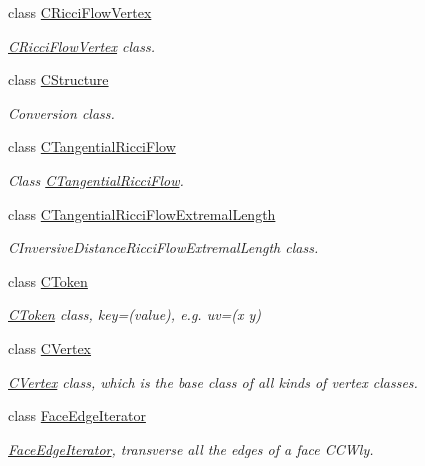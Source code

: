 \begin{DoxyCompactItemize}
class \hyperlink{class_mesh_lib_1_1_c_ricci_flow_vertex}{C\+Ricci\+Flow\+Vertex}
\begin{DoxyCompactList}\small\item\em \hyperlink{class_mesh_lib_1_1_c_ricci_flow_vertex}{C\+Ricci\+Flow\+Vertex} class. \end{DoxyCompactList}\item 
class \hyperlink{class_mesh_lib_1_1_c_structure}{C\+Structure}
\begin{DoxyCompactList}\small\item\em Conversion class. \end{DoxyCompactList}\item 
class \hyperlink{class_mesh_lib_1_1_c_tangential_ricci_flow}{C\+Tangential\+Ricci\+Flow}
\begin{DoxyCompactList}\small\item\em Class \hyperlink{class_mesh_lib_1_1_c_tangential_ricci_flow}{C\+Tangential\+Ricci\+Flow}. \end{DoxyCompactList}\item 
class \hyperlink{class_mesh_lib_1_1_c_tangential_ricci_flow_extremal_length}{C\+Tangential\+Ricci\+Flow\+Extremal\+Length}
\begin{DoxyCompactList}\small\item\em C\+Inversive\+Distance\+Ricci\+Flow\+Extremal\+Length class. \end{DoxyCompactList}\item 
class \hyperlink{class_mesh_lib_1_1_c_token}{C\+Token}
\begin{DoxyCompactList}\small\item\em \hyperlink{class_mesh_lib_1_1_c_token}{C\+Token} class, key=(value), e.\+g. uv=(x y) \end{DoxyCompactList}\item 
class \hyperlink{class_mesh_lib_1_1_c_vertex}{C\+Vertex}
\begin{DoxyCompactList}\small\item\em \hyperlink{class_mesh_lib_1_1_c_vertex}{C\+Vertex} class, which is the base class of all kinds of vertex classes. \end{DoxyCompactList}\item 
class \hyperlink{class_mesh_lib_1_1_face_edge_iterator}{Face\+Edge\+Iterator}
\begin{DoxyCompactList}\small\item\em \hyperlink{class_mesh_lib_1_1_face_edge_iterator}{Face\+Edge\+Iterator}, transverse all the edges of a face C\+C\+Wly. \end{DoxyCompactList}\item 

\end{DoxyCompactItemize}
